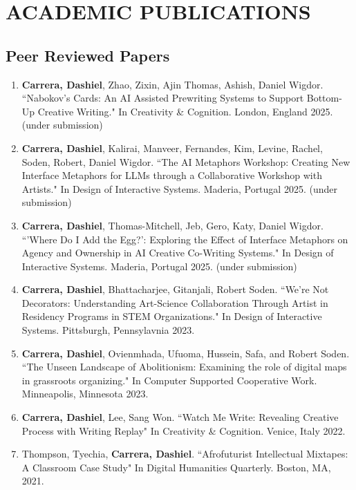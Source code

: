 \section{ACADEMIC PUBLICATIONS}

\subsection{Peer Reviewed Papers}
 \begin{enumerate}
 
  \item \textbf{Carrera, Dashiel}, Zhao, Zixin, Ajin Thomas, Ashish, Daniel Wigdor. ``Nabokov's Cards: An AI Assisted Prewriting Systems to Support Bottom-Up Creative Writing." In Creativity \& Cognition. London, England 2025. (under submission) \\
 
 
 \item \textbf{Carrera, Dashiel}, Kalirai, Manveer, Fernandes, Kim, Levine, Rachel, Soden, Robert, Daniel Wigdor. ``The AI Metaphors Workshop: Creating New Interface Metaphors for LLMs through a Collaborative Workshop with Artists." In Design of Interactive Systems. Maderia, Portugal 2025. (under submission) \\
  \item \textbf{Carrera, Dashiel}, Thomas-Mitchell, Jeb, Gero, Katy, Daniel Wigdor. ``'Where Do I Add the Egg?': Exploring the Effect of Interface Metaphors on Agency and Ownership in AI Creative Co-Writing Systems." In Design of Interactive Systems. Maderia, Portugal 2025. (under submission) \\

 
  \item \textbf{Carrera, Dashiel}, Bhattacharjee, Gitanjali, Robert Soden. ``We're Not Decorators: Understanding Art-Science Collaboration Through Artist in Residency Programs in STEM Organizations." In Design of Interactive Systems. Pittsburgh, Pennsylavnia 2023. \\
  \item \textbf{Carrera, Dashiel}, Ovienmhada, Ufuoma, Hussein, Safa, and Robert Soden. ``The Unseen Landscape of Abolitionism: Examining the role of digital maps in
grassroots organizing."  In Computer Supported Cooperative Work. Minneapolis, Minnesota 2023.\\
  \item \textbf{Carrera, Dashiel}, Lee, Sang Won. ``Watch Me Write: Revealing Creative Process with Writing Replay" In Creativity \& Cognition. Venice, Italy 2022. \\
  \item Thompson, Tyechia, \textbf{Carrera, Dashiel}. ``Afrofuturist Intellectual Mixtapes: A Classroom Case Study" In Digital Humanities Quarterly. Boston, MA, 2021.\
 \end{enumerate}

